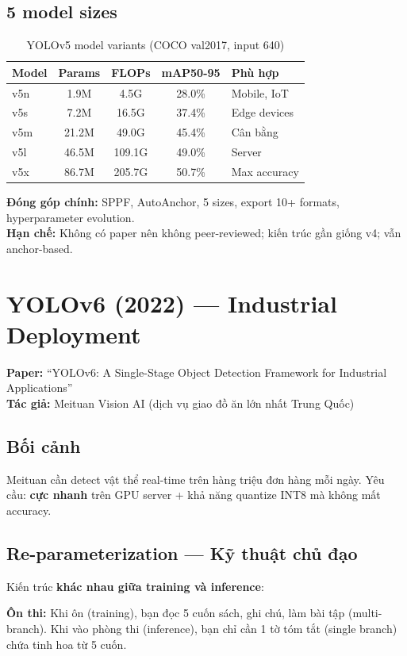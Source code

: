 \subsection{5 model sizes}
\begin{table}[H]\centering
\caption{YOLOv5 model variants (COCO val2017, input 640)}
\begin{tabular}{lcccl}\toprule
\textbf{Model} & \textbf{Params} & \textbf{FLOPs} & \textbf{mAP50-95} & \textbf{Phù hợp}\\\midrule
v5n & 1.9M & 4.5G & 28.0\% & Mobile, IoT \\
v5s & 7.2M & 16.5G & 37.4\% & Edge devices \\
v5m & 21.2M & 49.0G & 45.4\% & Cân bằng \\
v5l & 46.5M & 109.1G & 49.0\% & Server \\
v5x & 86.7M & 205.7G & 50.7\% & Max accuracy \\\bottomrule
\end{tabular}
\end{table}

\textbf{Đóng góp chính:} SPPF, AutoAnchor, 5 sizes, export 10+ formats, hyperparameter evolution.\\
\textbf{Hạn chế:} Không có paper nên không peer-reviewed; kiến trúc gần giống v4; vẫn anchor-based.

\section{YOLOv6 (2022) --- Industrial Deployment}
\textbf{Paper:} ``YOLOv6: A Single-Stage Object Detection Framework for Industrial Applications''\\
\textbf{Tác giả:} Meituan Vision AI (dịch vụ giao đồ ăn lớn nhất Trung Quốc)

\subsection{Bối cảnh}
Meituan cần detect vật thể real-time trên hàng triệu đơn hàng mỗi ngày. Yêu cầu: \textbf{cực nhanh} trên GPU server + khả năng quantize INT8 mà không mất accuracy.

\subsection{Re-parameterization --- Kỹ thuật chủ đạo}
Kiến trúc \textbf{khác nhau giữa training và inference}:

\begin{analogybox}
\textbf{Ôn thi:} Khi ôn (training), bạn đọc 5 cuốn sách, ghi chú, làm bài tập (multi-branch). Khi vào phòng thi (inference), bạn chỉ cần 1 tờ tóm tắt (single branch) chứa tinh hoa từ 5 cuốn.
\end{analogybox}

